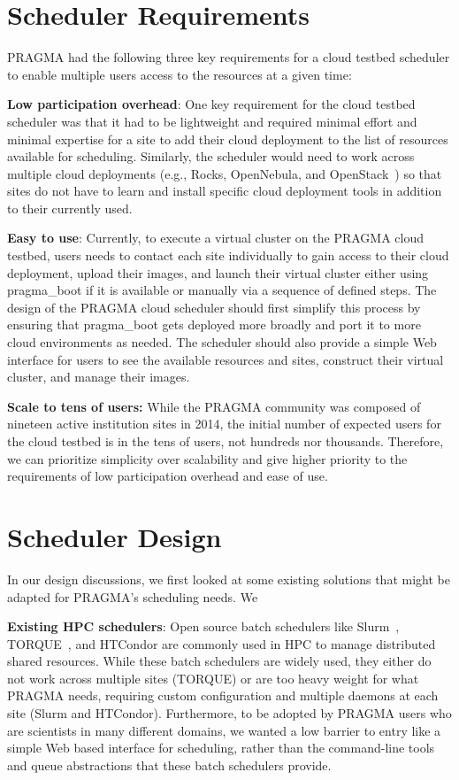 \documentclass{acm_proc_article-sp}
\begin{document}
\section{Scheduler Requirements}

PRAGMA had the following three key requirements for a cloud testbed scheduler to enable multiple users access to the resources at a  given time:

\textbf{Low participation overhead}:  One key requirement for the cloud testbed scheduler was that it had to be lightweight and required  minimal effort and minimal expertise for a site to add their cloud deployment to the list of resources available for scheduling.   Similarly, the scheduler would need to work across multiple cloud deployments (e.g., Rocks, OpenNebula, and OpenStack~\cite{openstack}) so that sites do not have to learn and install specific cloud deployment tools in addition to their currently used.  

\textbf{Easy to use}:  Currently, to execute a virtual cluster on the PRAGMA cloud testbed, users needs to contact each site individually to gain access to their cloud deployment, upload their images, and launch their virtual cluster either using pragma\_boot  if it is available or manually via a sequence of defined steps.   The design of the PRAGMA cloud scheduler should first simplify this process by ensuring that pragma\_boot gets deployed more broadly and port it to more cloud environments as needed.   The scheduler should also provide a simple Web interface for users to see the available resources and sites, construct their virtual cluster, and manage their images.

\textbf{Scale to tens of users:}  While the PRAGMA community was composed of nineteen active institution sites in 2014, the initial number of expected users for the cloud testbed is in the tens of users, not hundreds nor thousands.  Therefore, we can prioritize simplicity over scalability and give higher priority to the requirements of low participation overhead and ease of use.

\section{Scheduler Design}
\label{Sec:Design}

In our design discussions, we first looked at some existing solutions that might be adapted for PRAGMA's scheduling needs.  We 

\textbf{Existing HPC schedulers}:  Open source batch schedulers like Slurm~\cite{slurm}, TORQUE~\cite{torque}, and HTCondor are commonly used in  HPC to manage distributed  shared resources.  While these batch schedulers  are widely used, they either do not work across multiple sites (TORQUE) or are too heavy weight for what PRAGMA needs, requiring custom configuration and multiple daemons at each site (Slurm and HTCondor).  Furthermore, to be adopted by PRAGMA users who are scientists in many different domains,  we wanted a low barrier to entry like a simple Web based interface for scheduling, rather than the command-line tools and queue abstractions that these batch schedulers provide.
\end{document}
